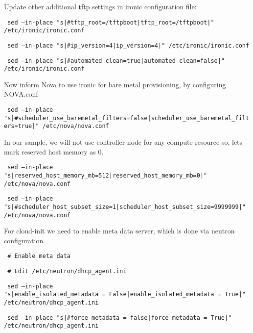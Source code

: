 \documentclass[12pt]{article}
\begin{document}
Update other additional tftp settings in ironic configuration file:

\begin{bash}\texttt{\small{ sed --in-place "s|\#tftp\_root=/tftpboot|tftp\_root=/tftpboot|" /etc/ironic/ironic.conf}}\end{bash}
\begin{bash}\texttt{\small{ sed --in-place "s|\#ip\_version=4|ip\_version=4|" /etc/ironic/ironic.conf}}\end{bash}
\begin{bash}\texttt{\small{ sed --in-place "s|\#automated\_clean=true|automated\_clean=false|" /etc/ironic/ironic.conf}}\end{bash}

Now inform Nova to use ironic for bare metal provisioning, by configuring NOVA.conf

\begin{bash}\texttt{\small{ sed --in-place "s|\#scheduler\_use\_baremetal\_filters=false|scheduler\_use\_baremetal\_filters=true|" /etc/nova/nova.conf}}\end{bash}

In our sample, we will not use controller node for any compute resource so, lets mark reserved host memory as 0.

\begin{bash}\texttt{\small{ sed --in-place "s|reserved\_host\_memory\_mb=512|reserved\_host\_memory\_mb=0|" /etc/nova/nova.conf}}\end{bash}
\begin{bash}\texttt{\small{ sed --in-place "s|\#scheduler\_host\_subset\_size=1|scheduler\_host\_subset\_size=9999999|" /etc/nova/nova.conf}}\end{bash}

For cloud-init we need to enable meta data server, which is done via neutron configuration.

\begin{bash}\texttt{\small{ \# Enable meta data}}\end{bash}
\begin{bash}\texttt{\small{ \# Edit /etc/neutron/dhcp\_agent.ini}}\end{bash}
\begin{bash}\texttt{\small{ sed --in-place "s|enable\_isolated\_metadata\ =\ False|enable\_isolated\_metadata\ =\ True|" /etc/neutron/dhcp\_agent.ini}}\end{bash}
\begin{bash}\texttt{\small{ sed --in-place "s|\#force\_metadata\ =\ false|force\_metadata\ =\ True|" /etc/neutron/dhcp\_agent.ini}}\end{bash}
\end{document}
